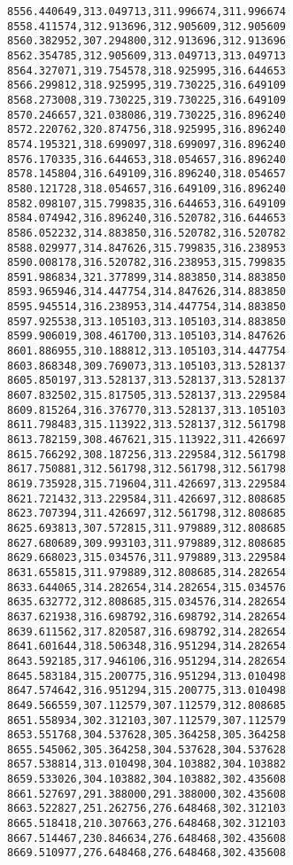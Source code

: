 \documentclass[11pt]{article}
\begin{document}
\begin{Verbatim}[commandchars=\\\{\}]
8556.440649,313.049713,311.996674,311.996674
8558.411574,312.913696,312.905609,312.905609
8560.382952,307.294800,312.913696,312.913696
8562.354785,312.905609,313.049713,313.049713
8564.327071,319.754578,318.925995,316.644653
8566.299812,318.925995,319.730225,316.649109
8568.273008,319.730225,319.730225,316.649109
8570.246657,321.038086,319.730225,316.896240
8572.220762,320.874756,318.925995,316.896240
8574.195321,318.699097,318.699097,316.896240
8576.170335,316.644653,318.054657,316.896240
8578.145804,316.649109,316.896240,318.054657
8580.121728,318.054657,316.649109,316.896240
8582.098107,315.799835,316.644653,316.649109
8584.074942,316.896240,316.520782,316.644653
8586.052232,314.883850,316.520782,316.520782
8588.029977,314.847626,315.799835,316.238953
8590.008178,316.520782,316.238953,315.799835
8591.986834,321.377899,314.883850,314.883850
8593.965946,314.447754,314.847626,314.883850
8595.945514,316.238953,314.447754,314.883850
8597.925538,313.105103,313.105103,314.883850
8599.906019,308.461700,313.105103,314.847626
8601.886955,310.188812,313.105103,314.447754
8603.868348,309.769073,313.105103,313.528137
8605.850197,313.528137,313.528137,313.528137
8607.832502,315.817505,313.528137,313.229584
8609.815264,316.376770,313.528137,313.105103
8611.798483,315.113922,313.528137,312.561798
8613.782159,308.467621,315.113922,311.426697
8615.766292,308.187256,313.229584,312.561798
8617.750881,312.561798,312.561798,312.561798
8619.735928,315.719604,311.426697,313.229584
8621.721432,313.229584,311.426697,312.808685
8623.707394,311.426697,312.561798,312.808685
8625.693813,307.572815,311.979889,312.808685
8627.680689,309.993103,311.979889,312.808685
8629.668023,315.034576,311.979889,313.229584
8631.655815,311.979889,312.808685,314.282654
8633.644065,314.282654,314.282654,315.034576
8635.632772,312.808685,315.034576,314.282654
8637.621938,316.698792,316.698792,314.282654
8639.611562,317.820587,316.698792,314.282654
8641.601644,318.506348,316.951294,314.282654
8643.592185,317.946106,316.951294,314.282654
8645.583184,315.200775,316.951294,313.010498
8647.574642,316.951294,315.200775,313.010498
8649.566559,307.112579,307.112579,312.808685
8651.558934,302.312103,307.112579,307.112579
8653.551768,304.537628,305.364258,305.364258
8655.545062,305.364258,304.537628,304.537628
8657.538814,313.010498,304.103882,304.103882
8659.533026,304.103882,304.103882,302.435608
8661.527697,291.388000,291.388000,302.435608
8663.522827,251.262756,276.648468,302.312103
8665.518418,210.307663,276.648468,302.312103
8667.514467,230.846634,276.648468,302.435608
8669.510977,276.648468,276.648468,302.435608

\end{Verbatim}
\end{document}
